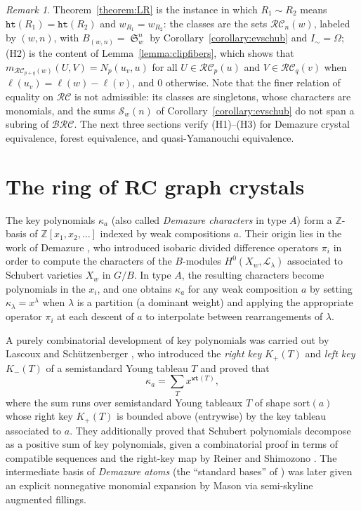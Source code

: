 \documentclass{amsart}
\theoremstyle{definition}
\theoremstyle{remark}
\newtheorem*{remark}{Remark}
\numberwithin{equation}{subsection}
\DeclareMathOperator{\sch}{\mathfrak{S}}
\newcommand{\wof}[1]{w_{#1}}
\newcommand{\wtt}{\mathtt{wt}}
\newcommand{\hr}{\mathtt{ht}}
\newcommand{\BRC}{\mathcal{BRC}}
\newcommand{\RC}{\mathcal{RC}}
\begin{document}
\begin{remark}\label{remark:general_lr_instances}
Theorem~\ref{theorem:LR} is the instance in which $R_1\sim R_2$ means $\hr(R_1)=\hr(R_2)$ and $\wof{R_1}=\wof{R_2}$: the classes are the sets $\RC_n(w)$, labeled by $(w,n)$, with $B_{(w,n)}=\sch_w^n$ by Corollary~\ref{corollary:evschub} and $I_\sim=\Omega$; (H2) is the content of Lemma~\ref{lemma:clipfibers}, which shows that $m_{\RC_{p+q}(w)}(U,V)=N_p(u_v,u)$ for all $U\in\RC_p(u)$ and $V\in\RC_q(v)$ when $\ell(u_v)=\ell(w)-\ell(v)$, and $0$ otherwise. Note that the finer relation of equality on $\RC$ is not admissible: its classes are singletons, whose characters are monomials, and the sums $\mathcal S_w(n)$ of Corollary~\ref{corollary:evschub} do not span a subring of $\BRC$. The next three sections verify (H1)--(H3) for Demazure crystal equivalence, forest equivalence, and quasi-Yamanouchi equivalence.
\end{remark}

\section{The ring of RC graph crystals}\label{section:crystals}

The key polynomials $\kappa_a$ (also called \emph{Demazure characters} in type $A$) form a $\mathbb{Z}$-basis of $\mathbb{Z}[x_1,x_2,\ldots]$ indexed by weak compositions $a$. Their origin lies in the work of Demazure \cite{demazure1974desingularisation,demazure1974nouvelle}, who introduced isobaric divided difference operators $\pi_i$ in order to compute the characters of the $B$-modules $H^0(X_w,\mathcal{L}_\lambda)$ associated to Schubert varieties $X_w$ in $G/B$. In type $A$, the resulting characters become polynomials in the $x_i$, and one obtains $\kappa_a$ for any weak composition $a$ by setting $\kappa_\lambda = x^\lambda$ when $\lambda$ is a partition (a dominant weight) and applying the appropriate operator $\pi_i$ at each descent of $a$ to interpolate between rearrangements of $\lambda$.

A purely combinatorial development of key polynomials was carried out by Lascoux and Schützenberger \cite{lascoux1990keys}, who introduced the \emph{right key} $K_+(T)$ and \emph{left key} $K_-(T)$ of a semistandard Young tableau $T$ and proved that
$$\kappa_a = \sum_{T} x^{\wtt(T)},$$
where the sum runs over semistandard Young tableaux $T$ of shape $\mathrm{sort}(a)$ whose right key $K_+(T)$ is bounded above (entrywise) by the key tableau associated to $a$. They additionally proved that Schubert polynomials decompose as a positive sum of key polynomials, given a combinatorial proof in terms of compatible sequences and the right-key map by Reiner and Shimozono \cite{reiner1995key}. The intermediate basis of \emph{Demazure atoms} (the ``standard bases'' of \cite{lascoux1990keys}) was later given an explicit nonnegative monomial expansion by Mason \cite{mason2009explicit} via semi-skyline augmented fillings.
\end{document}
